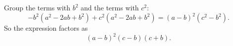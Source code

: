Group the terms with $b^2$ and the terms with $c^2$:
\[-b^2\left(a^2-2ab+b^2\right)+c^2\left(a^2-2ab+b^2\right)=(a-b)^2\left(c^2-b^2\right).\]
So the expression factors as
\[\boxed{(a-b)^2(c-b)(c+b)}.\]
